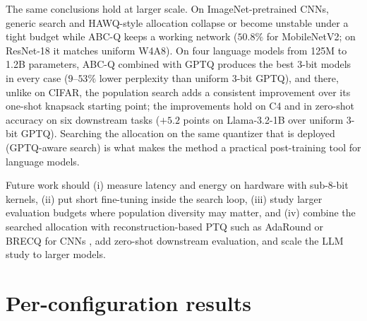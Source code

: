 \documentclass[11pt,a4paper]{article}
\begin{document}
The same conclusions hold at larger scale. On ImageNet-pretrained CNNs, generic search and HAWQ-style
allocation collapse or become unstable under a tight budget while ABC-Q keeps a working network
($50.8\%$ for MobileNetV2; on ResNet-18 it matches uniform W4A8). On four language models from 125M to 1.2B parameters, ABC-Q combined with
GPTQ produces the best 3-bit models in every case ($9$--$53\%$ lower perplexity than uniform 3-bit GPTQ),
and there, unlike on CIFAR, the population search adds a consistent improvement over its one-shot knapsack
starting point; the improvements hold on C4 and in zero-shot accuracy on six downstream tasks
($+5.2$ points on Llama-3.2-1B over uniform 3-bit GPTQ). Searching the allocation on the same quantizer that is deployed (GPTQ-aware search) is
what makes the method a practical post-training tool for language models.

Future work should (i) measure latency and energy on hardware with sub-8-bit kernels,
(ii) put short fine-tuning inside the search loop, (iii) study larger evaluation budgets where
population diversity may matter, and (iv) combine the searched allocation with reconstruction-based
PTQ such as AdaRound or BRECQ for CNNs \citep{Nagel2020AdaRound,Li2021BRECQ}, add zero-shot downstream
evaluation, and scale the LLM study to larger models.

\appendix
\section{Per-configuration results}
\label{app:tables}
\FloatBarrier








\FloatBarrier
\end{document}
